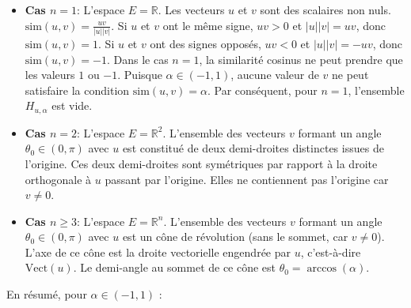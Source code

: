 \documentclass[11pt,a4paper]{report}
\begin{document}
\begin{enumerate}
  \begin{itemize}
  \item
    \textbf{Cas \(n=1\)}: L'espace \(E = \mathbb{R}\). Les vecteurs
    \(u\) et \(v\) sont des scalaires non nuls.
    \(\text{sim}(u, v) = \frac{uv}{|u||v|}\). Si \(u\) et \(v\) ont le
    même signe, \(uv > 0\) et \(|u||v| = uv\), donc
    \(\text{sim}(u, v) = 1\). Si \(u\) et \(v\) ont des signes opposés,
    \(uv < 0\) et \(|u||v| = -uv\), donc \(\text{sim}(u, v) = -1\). Dans
    le cas \(n=1\), la similarité cosinus ne peut prendre que les
    valeurs \(1\) ou \(-1\). Puisque \(\alpha \in (-1, 1)\), aucune
    valeur de \(v\) ne peut satisfaire la condition
    \(\text{sim}(u, v) = \alpha\). Par conséquent, pour \(n=1\),
    l'ensemble \(H_{u, \alpha}\) est vide.
  \item
    \textbf{Cas \(n=2\)}: L'espace \(E = \mathbb{R}^2\). L'ensemble des
    vecteurs \(v\) formant un angle \(\theta_0 \in (0, \pi)\) avec \(u\)
    est constitué de deux demi-droites distinctes issues de l'origine.
    Ces deux demi-droites sont symétriques par rapport à la droite
    orthogonale à \(u\) passant par l'origine. Elles ne contiennent pas
    l'origine car \(v \ne 0\).
  \item
    \textbf{Cas \(n \ge 3\)}: L'espace \(E = \mathbb{R}^n\). L'ensemble
    des vecteurs \(v\) formant un angle \(\theta_0 \in (0, \pi)\) avec
    \(u\) est un cône de révolution (sans le sommet, car \(v \ne 0\)).
    L'axe de ce cône est la droite vectorielle engendrée par \(u\),
    c'est-à-dire \(\text{Vect}(u)\). Le demi-angle au sommet de ce cône
    est \(\theta_0 = \arccos(\alpha)\).
  \end{itemize}

  En résumé, pour \(\alpha \in (-1, 1)\) :

  \begin{itemize}


\end{itemize}
\end{enumerate}
\end{document}
